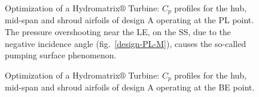 \begin{figure}[h!]
\begin{minipage}[b]{1\linewidth}
 \centering
\end{minipage}
\caption{Optimization of a Hydromatrix$\circledR$ Turbine: $C_p$ profiles for the hub, mid-span and shroud airfoils of design A operating at the PL point. The pressure overshooting near the LE, on the SS, due to the negative incidence angle (fig.\ \ref{design-PL-M}), causes the so-called pumping surface phenomenon.}
\label{LOADPLM}
\end{figure}

\begin{figure}[h!]
\begin{minipage}[b]{1\linewidth}
 \centering
\end{minipage}
\caption{Optimization of a Hydromatrix$\circledR$ Turbine: $C_p$ profiles for the hub, mid-span and shroud airfoils of design A operating at the BE point.}
\label{LOADBEM}
\end{figure}


